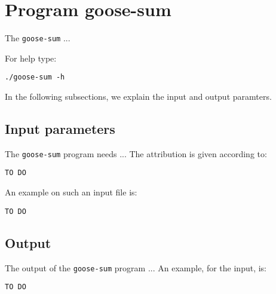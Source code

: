\section{Program goose-sum}
The \texttt{goose-sum} ...

For help type:
\begin{lstlisting}
./goose-sum -h
\end{lstlisting}
In the following subsections, we explain the input and output paramters.

\subsection{Input parameters}

The \texttt{goose-sum} program needs ...
The attribution is given according to:
\begin{lstlisting}
TO DO
\end{lstlisting}

An example on such an input file is:
\begin{lstlisting}
TO DO
\end{lstlisting}

\subsection{Output}
The output of the \texttt{goose-sum} program ...
An example, for the input, is:
\begin{lstlisting}
TO DO
\end{lstlisting}
